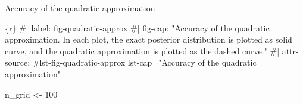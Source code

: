 \documentclass[
  letterpaper,
  DIV=11,
  numbers=noendperiod]{scrreprt}
\newenvironment{Shaded}{\begin{snugshade}}{\end{snugshade}}
\newcommand{\CommentTok}[1]{\textcolor[rgb]{0.37,0.37,0.37}{#1}}
\newcommand{\DecValTok}[1]{\textcolor[rgb]{0.68,0.00,0.00}{#1}}
\newcommand{\InformationTok}[1]{\textcolor[rgb]{0.37,0.37,0.37}{#1}}
\newcommand{\NormalTok}[1]{\textcolor[rgb]{0.00,0.23,0.31}{#1}}
\newcommand{\OtherTok}[1]{\textcolor[rgb]{0.00,0.23,0.31}{#1}}
\begin{document}
\begin{codelisting}

\caption{Accuracy of the quadratic approximation}

\hypertarget{lst-fig-quadratic-approx}{%
\label{lst-fig-quadratic-approx}}%
\begin{Shaded}
\begin{Highlighting}[]
\InformationTok{\textasciigrave{}\textasciigrave{}\textasciigrave{}\{r\}}
\CommentTok{\#| label: fig{-}quadratic{-}approx}
\CommentTok{\#| fig{-}cap: "Accuracy of the quadratic approximation. In each plot, the exact posterior distribution is plotted as solid curve, and the quadratic approximation is plotted as the dashed curve."}
\CommentTok{\#| attr{-}source: \textquotesingle{}\#lst{-}fig{-}quadratic{-}approx lst{-}cap="Accuracy of the quadratic approximation"\textquotesingle{}}

\NormalTok{n\_grid }\OtherTok{\textless{}{-}} \DecValTok{100}


\end{Highlighting}
\end{Shaded}
\end{codelisting}
\end{document}
